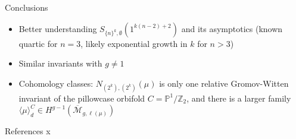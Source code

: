 \documentclass{beamer}
\newcommand{\Z}{\ensuremath{\mathbb{Z}}}
\renewcommand{\P}{\mathbb P}
\theoremstyle{definition}
\begin{document}
\begin{frame}{Conclusions}
\begin{itemize}
\begin{itemize}
                                                                                                                                                                                                                              \item Better understanding $S_{\{n\}^k,\emptyset}(1^{k(n-2)+2})$ and its asymptotics (known quartic for $n=3$, likely
                                                                                                                                                                                                                                exponential growth in $k$ for $n>3$)
                                                                                                                                                                                                                              \item Similar invariants with $g\neq 1$
                                                                                                                                                                                                                              \item Cohomology classes: $N_{(2^k),(2^k)}(\mu)$ is only one relative Gromov-Witten invariant of the pillowcase orbifold $C=\P^1/\Z_2$,
                                                                                                                                                                                                                                and there is a larger family $\langle \mu\rangle_d^{C}\in H^{g-1}(\overline{\mathcal M}_{g,\ell(\mu)})$
                                                                                                                                                                                                                              \end{itemize}
                                                                                                                                                                                                                            \end{itemize}
                                                                                                                                                                                                                          \end{frame}

                                                                                                                                                                                                                          \begin{frame}{References}
                                          x                                                                                                                                                                                  \end{frame}
\end{document}
